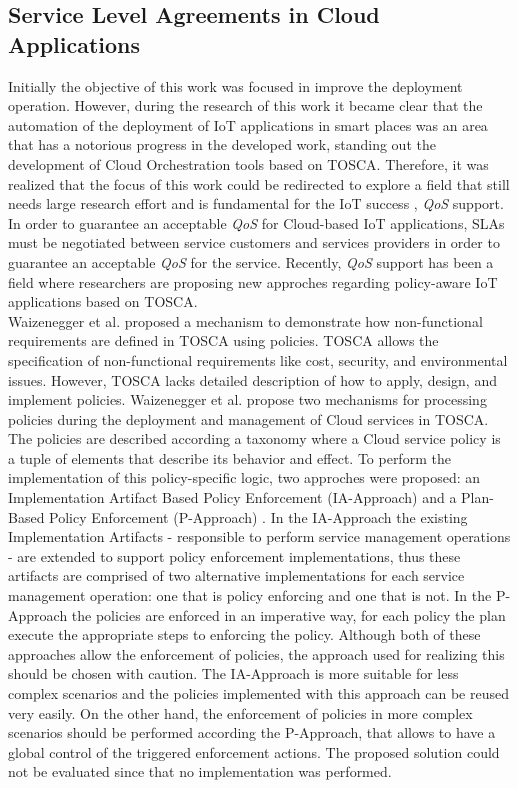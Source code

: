 \subsection{Service Level Agreements in Cloud Applications}
\label{sub:subsection label}
Initially the objective of this work was focused in improve the deployment operation. However, during
the research of this work it became clear that the automation of the deployment of IoT applications
in smart places was an area that has a notorious progress in the developed work, standing out the development
of Cloud Orchestration tools based on TOSCA. Therefore, it was realized that the focus of
this work could be redirected to explore a field that still needs large research effort and is fundamental
for the IoT success \cite{atzori2010internet}, \textit{QoS} support. In order to guarantee an acceptable \textit{QoS}
for Cloud-based IoT applications, SLAs must be negotiated between service customers and services
providers in order to guarantee an acceptable \textit{QoS} for the service. Recently, \textit{QoS} support has
been a field where researchers are proposing new approches regarding policy-aware IoT applications based on TOSCA.\\

Waizenegger et al. \cite{waizenegger2013policy4tosca} proposed a mechanism to demonstrate how non-functional
requirements are defined in TOSCA using policies. TOSCA allows the specification of non-functional requirements
like cost, security, and environmental issues. However, TOSCA lacks detailed description of how to apply, design,
and implement policies. Waizenegger et al. propose two mechanisms for processing policies during the deployment and
management of Cloud services in TOSCA. The policies are described according a taxonomy where a Cloud service
policy is a tuple of elements that describe its behavior and effect. To perform the implementation of this
policy-specific logic, two approches were proposed: an Implementation Artifact Based Policy Enforcement (IA-Approach)
and a Plan-Based Policy Enforcement (P-Approach) \cite{waizenegger2013policy4tosca}. In the IA-Approach the existing
Implementation Artifacts - responsible to perform service management operations - are extended to support
policy enforcement implementations, thus these artifacts are comprised of two alternative implementations
for each service management operation: one that is policy enforcing and one that is not. In the P-Approach the
policies are enforced in an imperative way, for each policy the plan execute the appropriate steps to enforcing
the policy. Although both of these approaches allow the enforcement of policies, the approach used for realizing
this should be chosen with caution. The IA-Approach is more suitable for less complex scenarios and the
policies implemented with this approach can be reused very easily. On the other hand, the enforcement of
policies in more complex scenarios should be performed according the P-Approach, that allows to have a global
control of the triggered enforcement actions. The proposed solution could not be evaluated since that no
implementation was performed.\\

